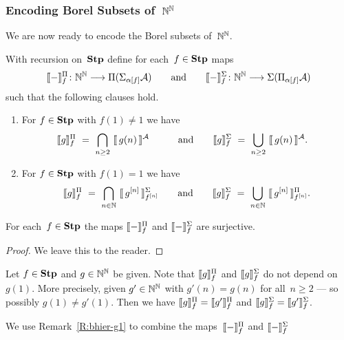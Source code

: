 \documentclass[main.tex]{subfiles}
\begin{document}
\subsubsection{Encoding Borel Subsets of~$\mathbb{N}^{\mathbb{N}}$}$\,$\\
We are now ready to encode the Borel subsets of~$\mathbb{N}^{\mathbb{N}}$.
\begin{dfn}
With recursion on~$\mathbf{Stp}$
define for each~$f\in\mathbf{Stp}$
maps
\begin{equation*}
\decode{-}^\Pi_f \colon \N^\N \longrightarrow \Pi(\Sigma_{\alpha[f]}\mathcal{A})
\qquad
\text{and}
\qquad
\decode{-}^\Sigma_f \colon \N^\N 
\longrightarrow \Sigma(\Pi_{\alpha[f]}\mathcal{A})
\end{equation*}
such that the following clauses hold.
\begin{enumerate}
\item
For $f\in \mathbf{Stp}$ with $f(1)\neq 1$ we have
\begin{alignat*}{3}
\decode{g}^\Pi_f \ &=\  
\bigcap_{n\geq 2} \ \decode{\,g(n)\,}^\mathcal{A}&
\qquad\text{and}\qquad
\decode{g}^\Sigma_f \ &=\ 
\bigcup_{n\geq 2}\  \decode{\,g(n)\,}^\mathcal{A}.
\end{alignat*}

\item
For $f\in \mathbf{Stp}$ with $f(1)= 1$
we have
\begin{equation*}
\decode{g}^\Pi_f \ =\ 
\bigcap_{n\in\N}\ \decode{\,g^{[n]}\,}^\Sigma_{f^{[n]}}
\qquad\text{and}\qquad
\decode{g}^\Sigma_f \ =\ 
{\bigcup_{n\in\N}}\ \decode{\,g^{[n]}\,}^\Pi_{f^{[n]}}.
\end{equation*}
\end{enumerate}
\end{dfn}
\begin{lem}
For each~$f\in\mathbf{Stp}$
the maps
$\decode{-}^\Pi_f$
and 
$\decode{-}^\Sigma_f$
are surjective.
\end{lem}
\begin{proof}
We leave this to the reader.
\end{proof}
\begin{rem}
\label{R:bhier-g1}
Let $f\in \mathbf{Stp}$
and $g\in \mathbb{N}^{\mathbb{N}}$ be given.
Note that $\decode{g}^\Pi_f$
and $\decode{g}^\Sigma_f$
do not depend on~$g(1)$.
More precisely,
given $g'\in\mathbb{N}^{\mathbb{N}}$ 
with $g'(n)=g(n)$ for all~$n\geq 2$
--- so  possibly $g(1) \neq g'(1)$.
Then we have  $\decode{g}^\Pi_f = \decode{g'}^\Pi_f$
and $\decode{g}^\Sigma_f = \decode{g'}^\Sigma_f$.
\end{rem}
We use Remark~\ref{R:bhier-g1}
to combine the maps~$\decode{-}^\Pi_f$
and $\decode{-}^\Sigma_f$
\end{document}

